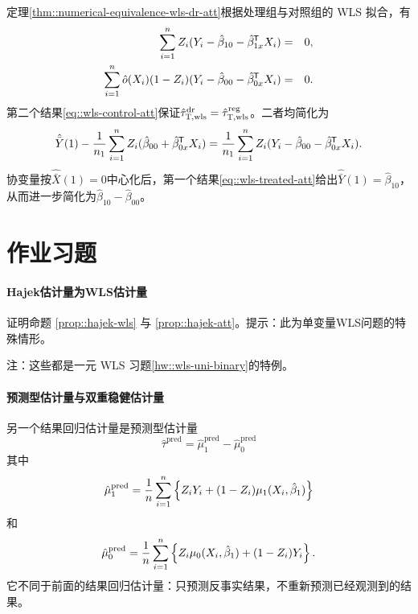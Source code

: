 \begin{myproof}{定理}{\ref{thm::numerical-equivalence-wls-dr-att}}根据处理组与对照组的 WLS 拟合，有
\begin{eqnarray}
\label{eq::wls-treated-att}
\sum_{i=1}^n Z_i ( Y_i -  \hat \beta_{10} -  \hat \beta_{1x}^{\mkern-1.5mu\mathsf{T}} X_i ) &=& 0 ,\\
\label{eq::wls-control-att}
 \sum_{i=1}^n \hat{o}(X_i)  (1-Z_i) ( Y_i - \hat \beta_{00} - \hat\beta_{0x}^{\mkern-1.5mu\mathsf{T}} X_i ) &=& 0.
\end{eqnarray}
第二个结果\eqref{eq::wls-control-att}保证$\hat{\tau}_{\textsc{T},\text{wls}}^\text{dr}  = \hat{\tau}_{\textsc{T},\text{wls}}^\text{reg} $。二者均简化为
$$
 \hat{\bar{Y}}(1) 
-  \frac{1}{n_1} \sum_{i=1}^n Z_i   (\hat \beta_{00} +   \hat\beta_{0x}^{\mkern-1.5mu\mathsf{T}} X_i)
= \frac{1}{n_1} \sum_{i=1}^n  Z_i(Y_i - \hat \beta_{00} - \hat\beta_{0x}^{\mkern-1.5mu\mathsf{T}} X_i) .
$$
协变量按$\hat{\bar{X}}(1) = 0$中心化后，第一个结果\eqref{eq::wls-treated-att}给出$\hat{\bar{Y}}(1)  =  \hat \beta_{10} $，从而进一步简化为$ \hat \beta_{10} - \hat \beta_{00}$。 
\end{myproof}






\section{作业习题}

\paragraph{Hajek估计量为WLS估计量}\label{hw::ate-hajek-wls}

证明命题 \ref{prop::hajek-wls} 与 \ref{prop::hajek-att}。提示：此为单变量WLS问题的特殊情形。 

注：这些都是一元 WLS 习题\ref{hw::wls-uni-binary}的特例。 

 
\paragraph{预测型估计量与双重稳健估计量}\label{hw::dr-projective-estimator}

另一个结果回归估计量是预测型估计量
$$
\hat{\tau}^\text{pred} = 
\hat{\mu}_1^\text{pred} - \hat{\mu}_0^\text{pred} 
$$
其中
$$
\hat{\mu}_1^\text{pred} = 
\frac{1}{n} \sum_{i=1}^n \left\{  Z_i Y_i + (1-Z_i)  \mu_1(X_i, \hat{\beta}_1)   \right\}
$$
和
$$
\hat{\mu}_0^\text{pred}  = 
\frac{1}{n} \sum_{i=1}^n \left\{  Z_i \mu_0(X_i, \hat{\beta}_1) + (1-Z_i) Y_i  \right\} .
$$
它不同于前面的结果回归估计量：只预测反事实结果，不重新预测已经观测到的结果。 


